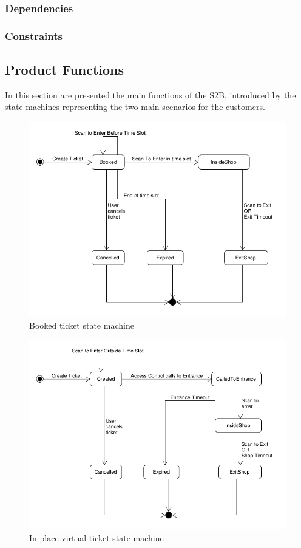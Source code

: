 \subsubsection{Dependencies}
\subsubsection{Constraints}

\subsection{Product Functions}

In this section are presented the main functions of the S2B, introduced by the state machines representing the two main scenarios for the customers.

\begin{figure}[H]
    \centering
    \includegraphics[width=\textwidth]{Images/UML_booked_ticket.png}
    \caption{\label{fig:Booked_Ticket_State}Booked ticket state machine}
\end{figure}

\vfill
\pagebreak

\begin{figure}[H]
    \centering
    \includegraphics[width=\textwidth]{Images/UML_in_place_virtual_ticket.png}
    \caption{ \label{fig:Booked_Ticket_State}In-place virtual ticket state machine}
\end{figure}

